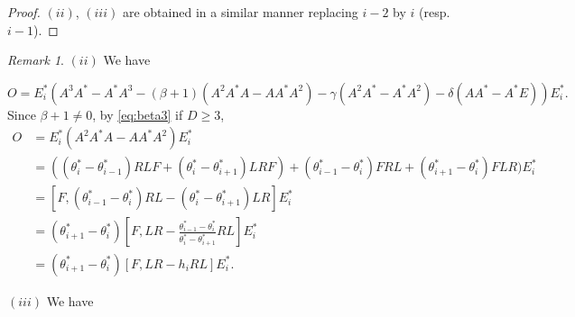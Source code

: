 \documentclass[
]{book}
\theoremstyle{definition}
\theoremstyle{definition}
\theoremstyle{definition}
\theoremstyle{definition}
\theoremstyle{remark}
\newtheorem*{remark}{Remark}
\begin{document}
\begin{proof}
\((ii)\), \((iii)\) are obtained in a similar manner replacing \(i-2\) by \(i\) (resp. \(i-1\)).

\end{proof}

\hfill\break

\begin{remark}
\leavevmode

\((ii)\) We have

\[O = E^*_i(A^3A^*-A^*A^3-(\beta+1)(A^2A^*A-AA^*A^2)-\gamma(A^2A^*-A^*A^2)-\delta(AA^*-A^*E))E^*_i.\]
Since \(\beta+1\neq 0\), by \eqref{eq:beta3} if \(D\geq 3\),
\begin{align}
O &= E^*_i(A^2A^*A - AA^*A^2)E^*_i\\
& = ((\theta^*_i-\theta^*_{i-1})RLF + (\theta^*_i-\theta^*_{i+1})LRF)+(\theta^*_{i-1}-\theta^*_i)FRL+(\theta^*_{i+1}-\theta^*_i)FLR)E^*_i\\
& = [F, (\theta^*_{i-1}-\theta^*_i)RL - (\theta^*_i-\theta^*_{i+1})LR]E^*_i\\
& = (\theta^*_{i+1}-\theta^*_i)\left[F, LR - \frac{\theta^*_{i-1}-\theta^*_i}{\theta^*_i-\theta^*_{i+1}}RL\right]E^*_i\\
& = (\theta^*_{i+1}-\theta^*_i)[F, LR - h_i RL]E^*_i.
\end{align}

\((iii)\) We have


\end{remark}
\end{document}
